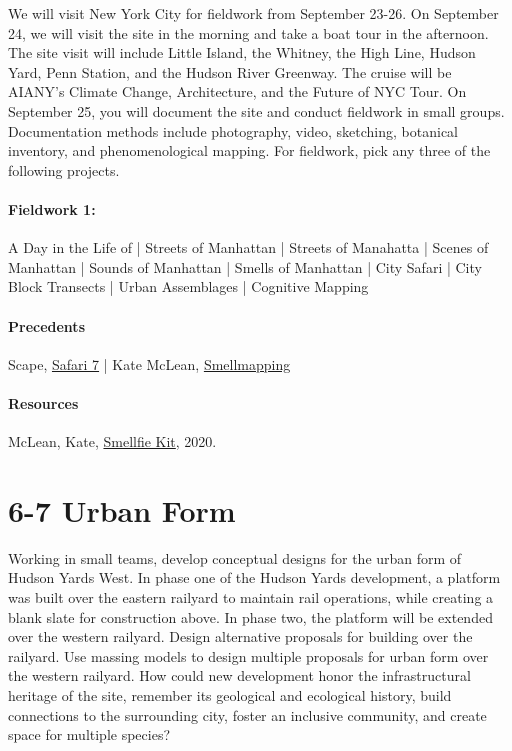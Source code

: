 \documentclass[11pt,article,oneside]{memoir}
\begin{document}
We will visit New York City for fieldwork from September 23-26. On September 24, we will visit the site in the morning and take a boat tour in the afternoon. The site visit will include Little Island, the Whitney, the High Line, Hudson Yard, Penn Station, and the Hudson River Greenway. The cruise will be AIANY's Climate Change, Architecture, and the Future of NYC Tour. On September 25, you will document the site and conduct fieldwork in small groups. Documentation methods include photography, video, sketching, botanical inventory, and phenomenological mapping. For fieldwork, pick any three of the following projects.

\paragraph{Fieldwork 1:} A Day in the Life of | Streets of Manhattan | Streets of Manahatta | Scenes of Manhattan | Sounds of Manhattan | Smells of Manhattan | City Safari | City Block Transects | Urban Assemblages | Cognitive Mapping

\paragraph{Precedents}
Scape, \href{https://www.scapestudio.com/projects/981/}{Safari 7} |
Kate McLean, \href{https://sensorymaps.com/?projects=summer-streets-smellmapping-astor-place-nyc}{Smellmapping}

\paragraph{Resources}
McLean, Kate, \href{https://sensorymaps.com/wp-content/uploads/2024/07/Smellfie_Kit_2020_compressed.pdf}{Smellfie Kit}, 2020.


\section{6-7 Urban Form}

Working in small teams, develop conceptual designs for the urban form of Hudson Yards West. In phase one of the Hudson Yards development, a platform was built over the eastern railyard to maintain rail operations, while creating a blank slate for construction above. In phase two, the platform will be extended over the western railyard. Design alternative proposals for building over the railyard. Use massing models to design multiple proposals for urban form over the western railyard. How could new development honor the infrastructural heritage of the site, remember its geological and ecological history, build connections to the surrounding city, foster an inclusive community, and create space for multiple species?
\end{document}

